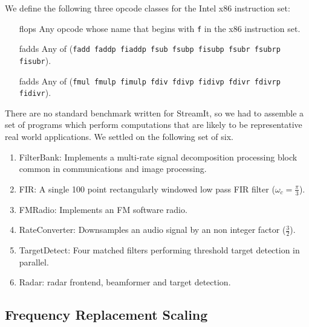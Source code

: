 We define the following three opcode classes for the Intel x86 instruction set:
\begin{itemize}
\item[flops] Any opcode whose name that begins with {\tt f} in the x86 instruction set.
\vspace{-6pt}
\item[fadds] Any of ({\tt fadd faddp fiaddp fsub fsubp fisubp fsubr fsubrp fisubr}).
\vspace{-6pt}
\item[fadds] Any of ({\tt fmul fmulp fimulp fdiv fdivp fidivp fdivr fdivrp fidivr}).
\vspace{-6pt}
\end{itemize}

There are no standard benchmark written for StreamIt, so we had to assemble
a set of programs which perform computations that are likely to be representative
real world applications. We settled on the following set of six.

\begin{enumerate}
\item FilterBank: Implements a multi-rate signal decomposition processing block common in communications and image processing.
\vspace{-6pt}

\item FIR: A single 100 point rectangularly windowed low pass FIR filter ($\omega_c=\frac{\pi}{3}$).
\vspace{-6pt}

\item FMRadio: Implements an FM software radio.
\vspace{-6pt}

\item RateConverter: Downsamples an audio signal by an non integer factor ($\frac{3}{2}$).
\vspace{-6pt}

\item TargetDetect: Four matched filters performing threshold target detection in parallel.
\vspace{-6pt}

\item Radar: radar frontend, beamformer and target detection.
\vspace{-6pt}
\end{enumerate}


\subsection{Frequency Replacement Scaling}

